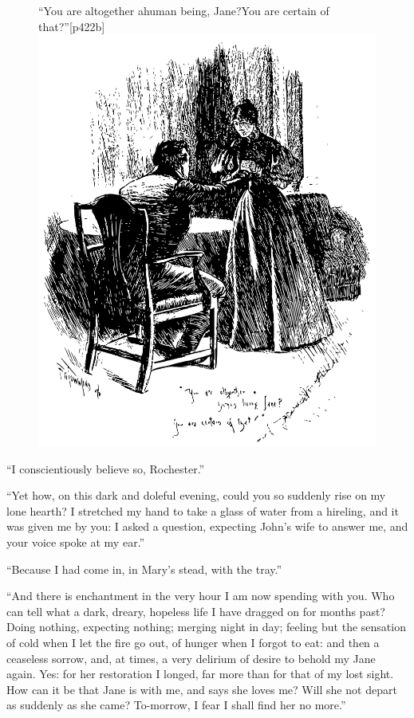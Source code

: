 \begin{figure}
	\begin{sidecaption}{\enquote{You are altogether a\linebreak human being, Jane?\linebreak You are certain of that?}}[p422b]
		\centering
		\includegraphics[width=\linewidth]{images/p422b.pdf}
	\end{sidecaption}
\end{figure}

\enquote{I conscientiously believe so, \Mr{} Rochester.}

\enquote{Yet how, on this dark and doleful evening, could you so
suddenly rise on my lone hearth? I stretched my hand to take a glass of
water from a hireling, and it was given me by you: I asked a question,
expecting John's wife to answer me, and your voice spoke at my ear.}

\enquote{Because I had come in, in Mary's stead, with the tray.}

\enquote{And there is enchantment in the very hour I am now spending
with you. Who can tell what a dark, dreary, hopeless life I have
dragged on for months past? Doing nothing, expecting nothing; merging
night in day; feeling but the sensation of cold when I let the fire go
out, of hunger when I forgot to eat: and then a ceaseless sorrow, and,
at times, a very delirium of desire to behold my Jane again. Yes: for
her restoration I longed, far more than for that of my lost sight. How
can it be that Jane is with me, and says she loves me? Will she not
depart as suddenly as she came? To-morrow, I fear I shall find her no
more.}


